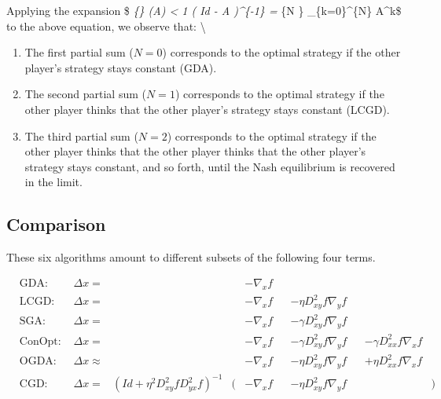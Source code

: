 \documentclass[11pt]{article}
\providecommand{\tightlist}{%
      \setlength{\itemsep}{0pt}\setlength{\parskip}{0pt}}
\begin{document}
Applying the expansion \$ \lambda\emph{\{\max\} (A) \textless{} 1
\Rightarrow \left( Id - A \right)\^{}\{-1\} = \lim}\{N
\rightarrow \infty\} \sum\_\{k=0\}\^{}\{N\} A\^{}k\$ to the above
equation, we observe that: \textbackslash{}

\begin{enumerate}
\def\labelenumi{\arabic{enumi}.}
\tightlist
\item
  The first partial sum (\(N = 0\)) corresponds to the optimal strategy
  if the other player's strategy stays constant (GDA).
\item
  The second partial sum (\(N = 1\)) corresponds to the optimal strategy
  if the other player thinks that the other player's strategy stays
  constant (LCGD).
\item
  The third partial sum (\(N = 2\)) corresponds to the optimal strategy
  if the other player thinks that the other player thinks that the other
  player's strategy stays constant, and so forth, until the Nash
  equilibrium is recovered in the limit.
\end{enumerate}

    \subsection{Comparison}\label{comparison}

These six algorithms amount to different subsets of the following four
terms.

\begin{align*}
       & \text{GDA: } &\Delta x =  &&&- \nabla_x f&\\
       & \text{LCGD: } &\Delta x =  &&&- \nabla_x f& &-\eta D_{xy}^2 f \nabla_y f&\\
       & \text{SGA: } &\Delta x =  &&&- \nabla_x f& &- \gamma D_{xy}^2 f \nabla_y f&  & & \\
       & \text{ConOpt: } &\Delta x =  &&&- \nabla_x f& &- \gamma D_{xy}^2 f \nabla_y f&  &- \gamma D_{xx}^2 f \nabla_x f& \\
       & \text{OGDA: } &\Delta x \approx &&&- \nabla_x f& &-\eta D_{xy}^2 f \nabla_y f&  &+\eta D_{xx}^2 f \nabla_x f& \\
       & \text{CGD: } &\Delta x = &\left(Id + \eta^2 D_{xy}^2 f D_{yx}^2 f\right)^{-1}&\bigl( &- \nabla_x f&  &-\eta D_{xy}^2 f \nabla_y f& & & \bigr)
     \end{align*}
\end{document}

